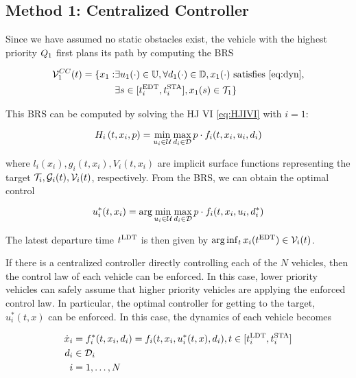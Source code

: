 \subsection{Method 1: Centralized Controller \label{sec:cc}}
Since we have assumed no static obstacles exist, the vehicle with the highest priority $Q_1$ first plans its path by computing the BRS

\begin{equation}
\begin{aligned}
\mathcal{V}_1^{CC}(t) = \{x_1: &\exists u_1(\cdot) \in \mathbb{U}, \forall d_1(\cdot) \in \mathbb{D}, x_1(\cdot) \text{ satisfies \eqref{eq:dyn}}, \\
&\exists s \in [t^\text{EDT}_i, t^\text{STA}_i], x_1(s) \in \mathcal{T}_1\}
\end{aligned}
\end{equation}

This BRS can be computed by solving the HJ VI \eqref{eq:HJIVI} with $i=1$:

\begin{equation}
H_i\left(t, x_i, p\right) = \min_{u_i \in \mathcal{U}} \max_{d_i \in \mathcal{D}} p \cdot f_i(t, x_i, u_i, d_i)
\end{equation}

\noindent where $l_i(x_i), g_i(t,x_i),V_i(t,x_i)$ are implicit surface functions representing the target $\mathcal{T}_i, \mathcal{G}_i(t), \mathcal{V}_i(t)$, respectively. From the BRS, we can obtain the optimal control

\begin{equation}
u_i^*(t,x_i) =  \arg \min_{u_i \in \mathcal{U}} \max_{d_i \in \mathcal{D}} p \cdot f_i(t, x_i, u_i, d^*_i)
\end{equation}

The latest departure time $t^\text{LDT}$ is then given by $\arg \inf_t x_i(t^\text{EDT}) \in \mathcal{V}_i(t)$.

If there is a centralized controller directly controlling each of the $N$ vehicles, then the control law of each vehicle can be enforced. In this case, lower priority vehicles can safely assume that higher priority vehicles are applying the enforced control law. In particular, the optimal controller for getting to the target, $u^*_i(t, x)$ can be enforced. In this case, the dynamics of each vehicle becomes 

\begin{equation}
\label{eq:dyn_cc}
\begin{aligned}
\dot x_i &= f^*_i (t, x_i, d_i) = f_i(t, x_i, u^*_i(t,x), d_i), t \in [t^\text{LDT}_i, t^\text{STA}_i] \\
d_i &\in \mathcal{D}_i \\
i &= 1,\ldots, N
\end{aligned}
\end{equation}

